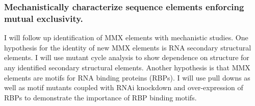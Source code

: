\documentclass[11pt]{article}
\begin{document}
\subsubsection{Mechanistically characterize sequence elements enforcing mutual exclusivity.} \label{aim:PKM_mechanistic}
I will follow up identification of MMX elements with mechanistic studies. 
One hypothesis for the identity of new MMX elements is RNA secondary structural elements. 
I will use mutant cycle analysis to show dependence on structure for any identified secondary structural elements. 
Another hypothesis is that MMX elements are motifs for RNA binding proteins (RBPs).
I will use pull downs as well as motif mutants coupled with RNAi knockdown and over-expression of RBPs to demonstrate the importance of RBP binding motifs. 







\printbibliography
\end{document}
